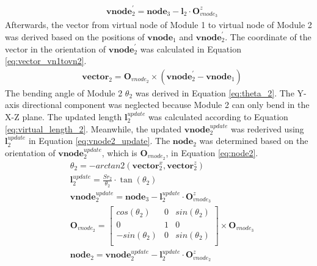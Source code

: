 \begin{itemize}
\begin{align}
        &\textbf{vnode}_{2}^{'} = \textbf{node}_{3} - \textbf{l}_{2} \cdot \textbf{O}_{vnode_3}^{z}
        \label{eq:vnode2_origin}
    \end{align}
    Afterwards, the vector from virtual node of Module 1 to virtual node of Module 2 was derived based on the 
    positions of $\textbf{vnode}_{1}$ and $\textbf{vnode}_{2}^{'}$. The coordinate of the vector in the orientation 
    of $\textbf{vnode}_{2}^{'}$ was calculated in Equation \ref{eq:vector_vn1tovn2}. 
    \begin{align}
        &\textbf{vector}_{2} = \textbf{O}_{vnode_2} \times (\textbf{vnode}_{2}^{'} - \textbf{vnode}_{1}) 
        \label{eq:vector_vn1tovn2} 
    \end{align}
    The bending angle of Module 2 $\theta_2$ was derived in Equation \ref{eq:theta_2}. The Y-axis directional 
    component was neglected because Module 2 can only bend in the X-Z plane. The updated length $\textbf{l}_{2}^{update}$ 
    was calculated according to Equation \ref{eq:virtual_length_2}. Meanwhile, the updated 
    $\textbf{vnode}_{2}^{update}$ was rederived using $\textbf{l}_{2}^{update}$ in Equation \ref{eq:vnode2_update}. 
    The $\textbf{node}_2$ was determined based on the orientation of $\textbf{vnode}_{2}^{update}$, 
    which is $\textbf{O}_{vnode_2}$, in Equation \ref{eq:node2}.
    \begin{align}
        &\theta_2 = -arctan2(\textbf{vector}_{2}^{x},\textbf{vector}_{2}^{z})
        \label{eq:theta_2} \\
        &\textbf{l}_{2}^{update} = \frac{Sr_2}{\theta_2}\cdot \tan(\theta_2)
        \label{eq:virtual_length_2} \\
        &\textbf{vnode}_{2}^{update} = \textbf{node}_{3} - \textbf{l}_{2}^{update} \cdot \textbf{O}_{vnode_3}^{z}
        \label{eq:vnode2_update} \\
        &\textbf{O}_{vnode_2} =     
        \begin{bmatrix}
            cos(\theta_2) & 0 & sin(\theta_2) \\
            0 & 1 & 0 \\
            -sin(\theta_2) & 0 & sin(\theta_2) \\
        \end{bmatrix}  
        \times \textbf{O}_{vnode_3}
        \label{eq:orientation_vnode2} \\
        &\textbf{node}_2 = \textbf{vnode}_{2}^{update} - \textbf{l}_{2}^{update} \cdot \textbf{O}_{vnode_2}^{z}
        \label{eq:node2} 
    \end{align}

\end{itemize}
